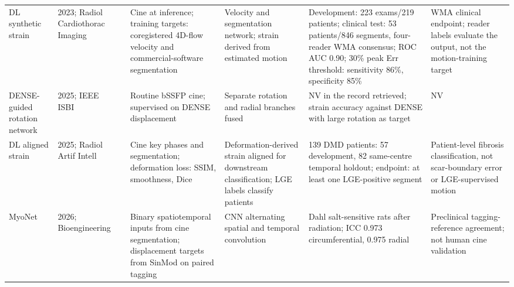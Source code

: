 \documentclass[11pt,a4paper]{article}
\begin{document}
{\begin{longtable}{L{0.11\textwidth}L{0.115\textwidth}L{0.16\textwidth}L{0.185\textwidth}L{0.205\textwidth}L{0.165\textwidth}}
\addlinespace
DL synthetic strain & 2023; Radiol Cardiothorac Imaging~\cite{masutani2023dlss} & Cine at inference; training targets: coregistered 4D-flow velocity and commercial-software segmentation & Velocity and segmentation network; strain derived from estimated motion & Development: 223 exams/219 patients; clinical test: 53 patients/846 segments, four-reader WMA consensus; ROC AUC 0.90; 30\% peak Err threshold: sensitivity 86\%, specificity 85\% & WMA clinical endpoint; reader labels evaluate the output, not the motion-training target \\
\addlinespace
DENSE-guided rotation network & 2025; IEEE ISBI~\cite{lei2025denserotation} & Routine bSSFP cine; supervised on DENSE displacement & Separate rotation and radial branches fused & NV in the record retrieved; strain accuracy against DENSE with large rotation as target & NV \\
\addlinespace
DL aligned strain & 2025; Radiol Artif Intell~\cite{koehler2025alignedstrain} & Cine key phases and segmentation; deformation loss: SSIM, smoothness, Dice & Deformation-derived strain aligned for downstream classification; LGE labels classify patients & 139 DMD patients: 57 development, 82 same-centre temporal holdout; endpoint: at least one LGE-positive segment & Patient-level fibrosis classification, not scar-boundary error or LGE-supervised motion \\
\addlinespace
MyoNet & 2026; Bio\-engineering~\cite{an2026myonet} & Binary spatiotemporal inputs from cine segmentation; displacement targets from SinMod on paired tagging & CNN alternating spatial and temporal convolution & Dahl salt-sensitive rats after radiation; ICC 0.973 circumferential, 0.975 radial & Preclinical tagging-reference agreement; not human cine validation \\
\bottomrule
\end{longtable}
}



\end{document}
